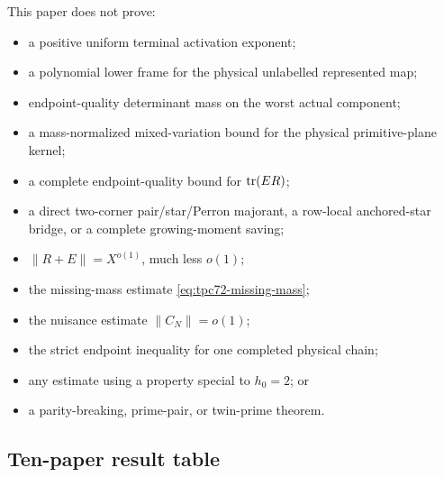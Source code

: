 This paper does not prove:
\begin{itemize}
 \item a positive uniform terminal activation exponent;
 \item a polynomial lower frame for the physical unlabelled represented map;
 \item endpoint-quality determinant mass on the worst actual component;
 \item a mass-normalized mixed-variation bound for the physical
       primitive-plane kernel;
 \item a complete endpoint-quality bound for \(\operatorname{tr}(ER)\);
 \item a direct two-corner pair/star/Perron majorant, a row-local
       anchored-star bridge, or a complete growing-moment saving;
 \item \(\|R+E\|=X^{o(1)}\), much less \(o(1)\);
 \item the missing-mass estimate
       \eqref{eq:tpc72-missing-mass};
 \item the nuisance estimate \(\|C_N\|=o(1)\);
 \item the strict endpoint inequality for one completed physical chain;
 \item any estimate using a property special to \(h_0=2\); or
 \item a parity-breaking, prime-pair, or twin-prime theorem.
\end{itemize}

\subsection{Ten-paper result table}

